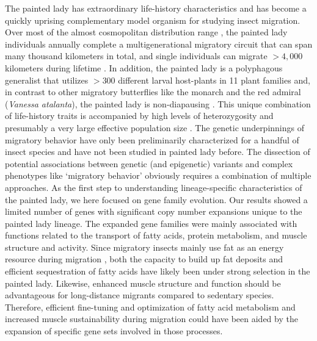 \documentclass[twocolumn]{bmcart}%
\begin{document}
The painted lady has extraordinary life-history characteristics and has become a quickly uprising complementary model organism for studying insect migration. Over most of the almost cosmopolitan distribution range \cite{shieldsJournalLepidopteristsSociety1992}, the painted lady individuals annually complete a multigenerational migratory circuit that can span many thousand kilometers in total, and single individuals can migrate $>4,000$ kilometers during lifetime \cite{talaveraDiscoveryMassMigration2016}. In addition, the painted lady is a polyphagous generalist that utilizes $>300$ different larval host-plants in 11 plant families \cite{celorio-manceraEvolutionaryHistoryHost2016, hostsHOSTSDatabaseWorld, nylinHOSTPLANTUTILIZATION2014} and, in contrast to other migratory butterflies like the monarch and the red admiral (\textit{Vanessa atalanta}), the painted lady is non-diapausing \cite{shieldsJournalLepidopteristsSociety1992}. This unique combination of life-history traits is accompanied by high levels of heterozygosity and presumably a very large effective population size \cite{garcia-berroGenomicDemographicInferenceinprep}. The genetic underpinnings of migratory behavior have only been preliminarily characterized for a handful of insect species \cite{kangAnalysisLargescaleGene2004, zhuDefiningBehavioralMolecular2009} and have not been studied in painted lady before. The dissection of potential associations between genetic (and epigenetic) variants and complex phenotypes like ‘migratory behavior’ obviously requires a combination of multiple approaches. As the first step to understanding lineage-specific characteristics of the painted lady, we here focused on gene family evolution. Our results showed a limited number of genes with significant copy number expansions unique to the painted lady lineage. The expanded gene families were mainly associated with functions related to the transport of fatty acids, protein metabolism, and muscle structure and activity. Since migratory insects mainly use fat as an energy resource during migration \cite{landysMetabolicProfileLongdistance2005, murataUtilizationLipidFlight2013, srygleyOptimalStrategiesInsects2008, weberPhysiologyLongdistanceMigration2009}, both the capacity to build up fat deposits and efficient sequestration of fatty acids have likely been under strong selection in the painted lady. Likewise, enhanced muscle structure and function should be advantageous for long-distance migrants compared to sedentary species. Therefore, efficient fine-tuning and optimization of fatty acid metabolism and increased muscle sustainability during migration could have been aided by the expansion of specific gene sets involved in those processes.
\end{document}
